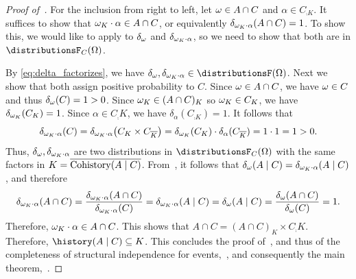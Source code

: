 \documentclass[USenglish,onecolumn]{article}
\begin{document}
\begin{proof}[Proof of~]
  For the inclusion from right to left,
   let $\omega \in A \cap C$ and $\alpha \in C_{\comp{K}}$.
  It suffices to show that $\omega_K \cdot \alpha \in A \cap C$, or equivalently $\delta_{\omega_K \cdot \alpha}(A \cap C) = 1$. To show this, we would like to apply  to $\delta_{\omega}$ and $\delta_{\omega_K \cdot \alpha}$, so we need to show that both are in $\distributionsF_C(\Omg)$.

  By \eqref{eq:delta_factorizes}, we have $\delta_{\omg}, \delta_{\omg_K \cdot \alpha} \in \distributionsF(\Omg)$. Next we show that both assign positive probability to $C$.
  Since $\omega\in A\cap C$, we have $\omega\in C$ and thus $\delta_\omega(C)=1>0$.
  Since $\omega_K\in (A\cap C)_K$ so $\omega_K\in C_K$, we have $\delta_{\omega_K}(C_K)=1$. Since $\alpha\in C_\comp{K}$, we have $ \delta_\alpha(C_{\comp{K}})=1$. It follows that
  \begin{equation*}
    \delta_{\omega_K \cdot \alpha}(C) = \delta_{\omega_K \cdot \alpha}\big( C_K \times C_{{\overline{K}}} \big) = \delta_{\omega_K}(C_K) \cdot \delta_\alpha(C_{{\overline{K}}}) = 1 \cdot 1 = 1 > 0.
  \end{equation*}
  Thus, $\delta_{\omega}, \delta_{\omega_K \cdot \alpha}$ are two distributions in $\distributionsF_{C}(\Omg)$ with the same factors in $K = {\overline{\operatorname{Cohistory}(A \mid C)}}$.
  From~, it follows that $\delta_\omega(A \mid C) = \delta_{\omega_K \cdot \alpha}(A \mid C)$, and therefore
  \begin{align*}
    \delta_{\omega_K \cdot \alpha}(A \cap C)= \frac{\delta_{\omega_K \cdot \alpha}(A \cap C)}{\delta_{\omega_K \cdot \alpha}(C)} = \delta_{\omega_K \cdot \alpha}(A \mid C) =\delta_\omega(A \mid C)=\frac{\delta_\omega(A \cap C)}{\delta_\omega(C)}  = 1.\\
  \end{align*}
  Therefore, $\omega_K \cdot \alpha \in A \cap C$. This shows that $A\cap C=(A\cap C)_K\times C_\comp{K}$. Therefore, $\history(A\given C)\subseteq K$.
  This concludes the proof of~, and thus of the completeness of structural independence for events,~, and consequently the main theorem,~.
\end{proof}
\end{document}
